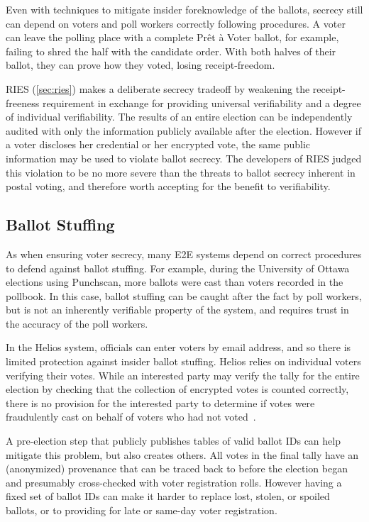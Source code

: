 Even with techniques to mitigate insider foreknowledge of the ballots,
secrecy still can depend on voters and poll workers correctly
following procedures. A voter can leave the polling place with a
complete Prêt à Voter ballot, for example, failing to shred the half
with the candidate order. With both halves of their ballot, they can
prove how they voted, losing receipt-freedom.

RIES (\autoref{sec:ries}) makes a deliberate secrecy tradeoff by
weakening the receipt-freeness requirement in exchange for providing
universal verifiability and a degree of individual verifiability. The
results of an entire election can be independently audited with only
the information publicly available after the election. However if a
voter discloses her credential or her encrypted vote, the same public
information may be used to violate ballot secrecy. The developers of
RIES judged this violation to be no more severe than the threats to
ballot secrecy inherent in postal voting, and therefore worth
accepting for the benefit to verifiability.

\subsection{Ballot Stuffing}

As when ensuring voter secrecy, many E2E systems depend on correct
procedures to defend against ballot stuffing. For example, during the
University of Ottawa elections using Punchscan, more ballots were cast
than voters recorded in the pollbook. In this case, ballot stuffing
can be caught after the fact by poll workers, but is not an inherently
verifiable property of the system, and requires trust in the accuracy
of the poll workers.

In the Helios system, officials can enter voters by email address, and
so there is limited protection against insider ballot stuffing. Helios
relies on individual voters verifying their votes. While an interested party may verify the tally for the entire election by checking that the collection of encrypted votes is counted correctly,
there is no provision for the interested party to determine if votes were fraudulently cast on behalf of voters who had not voted~\cite{orion2009}.

A pre-election step that publicly publishes tables of valid ballot IDs
can help mitigate this problem, but also creates others. All votes in
the final tally have an (anonymized) provenance that can be traced
back to before the election began and presumably cross-checked with
voter registration rolls. However having a fixed set of ballot IDs can
make it harder to replace lost, stolen, or spoiled ballots, or to
providing for late or same-day voter registration.

